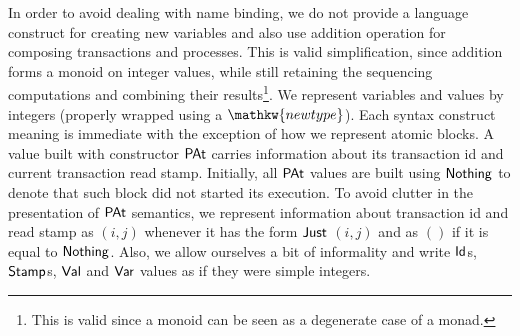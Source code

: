 \documentclass[sigplan]{acmart}
\def\resethooks{%
  \global\let\SaveRestoreHook\empty
  \global\let\ColumnHook\empty}
\newlength{\blanklineskip}
\let\hspre\empty
\let\hspost\empty
\theoremstyle{definition}
\newcommand{\D}[1]{\blue{\mathsf{#1}}}
\newcommand{\C}[1]{\red{\mathsf{#1}}}
\begin{document}
\resethooks

In order to avoid dealing with name binding, we do
not provide a language construct for creating new
variables and also use addition operation for
composing transactions and processes. This is valid simplification,
since addition forms a monoid on integer values, while still retaining
the sequencing computations and combining their results\footnote{This is valid since a monoid can be seen as a degenerate case of a monad.}.
We represent variables and values by integers (properly
wrapped using a \ensuremath{\mathkw{newtype}}). Each syntax construct meaning
is immediate with the exception of how we represent atomic blocks. A value built with constructor
\ensuremath{\C{PAt}} carries information about its transaction id and current
transaction read stamp. Initially, all \ensuremath{\C{PAt}} values are built using
\ensuremath{\C{Nothing}} to denote that such block did not started its execution.
To avoid clutter in the presentation of \ensuremath{\C{PAt}} semantics, we represent
information about transaction id and read stamp as $(i,j)$ whenever it
has the form \ensuremath{\C{Just}} $(i,j)$ and as $()$ if it is equal to \ensuremath{\C{Nothing}}. Also,
we allow ourselves a bit of informality and write \ensuremath{\D{Id}}s, \ensuremath{\D{Stamp}}s, \ensuremath{\D{Val}}
and \ensuremath{\D{Var}} values as if they were simple integers.
\end{document}
